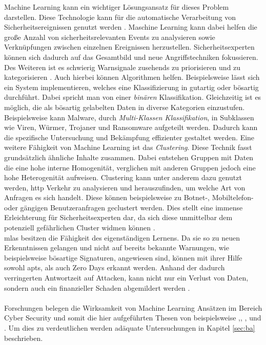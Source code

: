 \documentclass[
    12pt, %
    DIV10,
    ngerman, %
    a4paper, %
    oneside, %
    titlepage, %
    parskip=half, %
    headings=normal, %
    listof=totoc, %
    bibliography=totoc, %
    index=totoc, %
    captions=tableheading, %
    final %
]{scrreprt}
\begin{document}
Machine Learning kann ein wichtiger Lösungsansatz für dieses Problem darstellen. Diese Technologie kann für die automatische Verarbeitung von Sicherheitsereignissen genutzt werden \parencite{Singla2019}. Maschine Learning kann dabei helfen die gro{\ss}e Anzahl von sicherheitsrelevanten Events zu analysieren sowie Verknüpfungen zwischen einzelnen Ereignissen herzustellen. Sicherheitsexperten können sich dadurch auf das Gesamtbild und neue Angriffstechniken fokussieren. Des Weiteren ist es schwierig Warnsignale zusehends zu priorisieren und zu kategorisieren \parencite{JoshuaSaxe2018}. Auch hierbei können Algorithmen helfen. Beispielsweise lässt sich ein System implementieren, welches eine Klassifizierung in gutartig oder bösartig durchführt. Dabei spricht man von einer \emph{binären} Klassifikation. Gleichzeitig ist es möglich, die als bösartig gelabelten Daten in diverse Kategorien einzustufen. Beispielsweise kann Malware, durch \emph{Multi-Klassen Klassifikation}, in Subklassen wie Viren, Würmer, Trojaner und Ransomware aufgeteilt werden. Dadurch kann die spezifische Untersuchung und Bekämpfung effizienter gestaltet werden. Eine weitere Fähigkeit von Machine Learning ist das \emph{Clustering}. Diese Technik fasst grundsätzlich ähnliche Inhalte zusammen. Dabei entstehen Gruppen mit Daten die eine hohe interne Homogenität, verglichen mit anderen Gruppen jedoch eine hohe Heterogenität aufweisen. Clustering kann unter anderem dazu genutzt werden, \ac{http} Verkehr zu analysieren und herauszufinden, um welche Art von Anfragen es sich handelt. Diese können beispielsweise zu Botnet-, Mobiltelefon- oder gängigen Benutzeranfragen geclustert werden. Dies stellt eine immense Erleichterung für Sicherheitsexperten dar, da sich diese unmittelbar dem potenziell gefährlichen Cluster widmen können \parencite{JoshuaSaxe2018}. \\\ac{mlas} besitzen die Fähigkeit des eigenständigen Lernens. Da sie so zu neuen Erkenntnissen gelangen und nicht auf bereits bekannte Warnungen, wie beispielsweise bösartige Signaturen, angewiesen sind, können mit ihrer Hilfe sowohl \ac{apts}, als auch Zero Days erkannt werden. Anhand der dadurch verringerten Antwortzeit auf Attacken, kann nicht nur ein Verlust von Daten, sondern auch ein finanzieller Schaden abgemildert werden \parencite{Hu2019}.
\\\\
Forschungen belegen die Wirksamkeit von Machine Learning Ansätzen im Bereich Cyber Security und somit die hier aufgeführten Thesen von beispielsweise \textcite{Homoliak2019},\textcite{Jeong2019}, \textcite{Sabar2018}, \textcite{Brown2018} und \textcite{Yin2017}. Um dies zu verdeutlichen werden adäquate Untersuchungen in Kapitel \ref{sec:ba} beschrieben.
\end{document}
